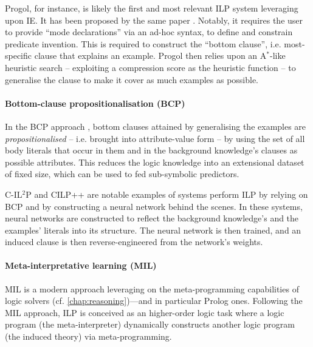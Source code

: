 \documentclass[12pt,a4paper,openright,twoside]{book}
\begin{document}
Progol, for instance, is likely the first and most relevant ILP system leveraging upon IE.
%
It has been proposed by the same paper \cite{Muggleton95}. %
%
Notably, it requires the user to provide ``mode declarations'' via an ad-hoc syntax, to define and constrain predicate invention.
%
This is required to construct the ``bottom clause'', i.e.  most-specific clause that explains an example.
%
Progol then relies upon an A$^*$-like heuristic search -- exploiting a compression score as the heuristic function -- to generalise the clause to make it cover as much examples as possible.
%
%

\paragraph{Bottom-clause propositionalisation (BCP)}

In the BCP approach \cite{Franca2014}, bottom clauses attained by generalising the examples are \emph{propositionalised} -- i.e. brought into attribute-value form -- by using the set of all body literals that occur in them and in the background knowledge's clauses as possible attributes.
%
This reduces the logic knowledge into an extensional dataset of fixed size, which can be used to fed sub-symbolic predictors.

C-IL$^2$P \cite{GarcezZ99} and CILP++ \cite{Franca2014} are notable examples of systems perform ILP by relying on BCP and by constructing a neural network behind the scenes.
%
In these systems, neural networks are constructed to reflect the background knowledge's and the examples' literals into its structure.
%
The neural network is then trained, and an induced clause is then reverse-engineered from the network's weights.

\paragraph{Meta-interpretative learning (MIL)}

MIL \cite{MuggletonLPT14} is a modern approach leveraging on the meta-programming capabilities of logic solvers (cf. \cref{chap:reasoning})---and in particular Prolog ones.
%
Following the MIL approach, ILP is conceived as an higher-order logic task where a logic program (the meta-interpreter) dynamically constructs another logic program (the induced theory) via meta-programming.
\end{document}
